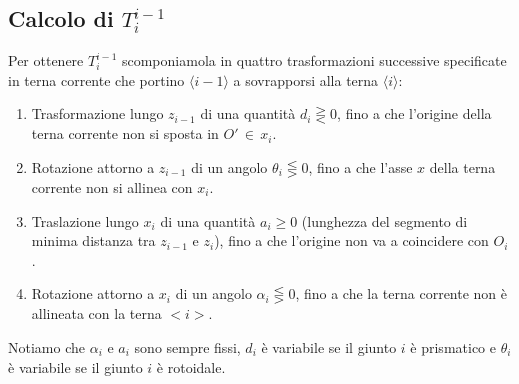 \subsection{Calcolo di $T_i^{i-1}$}
Per ottenere $T_i^{i-1}$ scomponiamola in quattro trasformazioni successive specificate in terna corrente che portino $\langle i-1 \rangle$ a sovrapporsi alla terna $\langle i \rangle$:
\begin{enumerate}
	\item Trasformazione lungo $z_{i-1}$ di una quantità $d_{i}\gtreqless0$, fino a che l'origine della terna corrente non si sposta in $O'\,\in\,x_i$.
	\item Rotazione attorno a $z_{i-1}$ di un angolo $\theta_{i}\lesseqgtr0$, fino a che l'asse $x$ della terna corrente non si allinea con $x_i$.
	\item Traslazione lungo $x_i$ di una quantità $a_{i}\geqslant0$ (lunghezza del segmento di minima distanza tra $z_{i-1}$ e $z_i$), fino a che l'origine non va a coincidere con $O_i$.
	\item Rotazione attorno a $x_i$ di un angolo $\alpha_{i}\lesseqgtr0$, fino a che la terna corrente non è allineata con la terna $<i>$.
\end{enumerate}
Notiamo che $\alpha_i$ e $a_i$ sono sempre fissi, $d_i$ è variabile se il giunto $i$ è prismatico e $\theta_i$ è variabile se il giunto $i$ è rotoidale.

